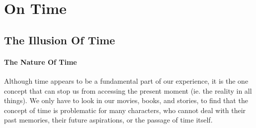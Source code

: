 \documentclass[a4paper, 12pt]{article}
\begin{document}
\section{On Time}
\subsection{The Illusion Of Time}
\paragraph{The Nature Of Time}
Although time appears to be a fundamental part of our experience, it is the one concept that can stop us from accessing the present moment (ie. the reality in all things). We only have to look in our movies, books, and stories, to find that the concept of time is problematic for many characters, who cannot deal with their past memories, their future aspirations, or the passage of time itself. \\
\end{document}
